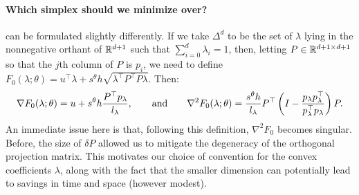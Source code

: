 \documentclass[eikonal.tex]{subfiles}
\begin{document}
\paragraph{Which simplex should we minimize over?}
 can be formulated
slightly differently. If we take $\Delta^d$ to be the set of $\lambda$
lying in the nonnegative orthant of $\mathbb{R}^{d+1}$ such that
$\sum_{i=0}^d \lambda_i = 1$, then, letting
$P \in \mathbb{R}^{d + 1 \times d + 1}$ so that the $j$th column of $P$ is
$p_i$, we need to define
$F_0(\lambda; \theta) = u^\top \lambda + s^{\theta} h \sqrt{\lambda^\top
  P^\top P \lambda}$. Then:
\begin{equation*}
  \nabla F_0(\lambda; \theta) = u + s^{\theta} h \frac{P^\top p_\lambda}{l_\lambda}, \qquad \text{and} \qquad \nabla^2 F_0(\lambda; \theta) = \frac{s^{\theta} h}{l_\lambda} P^\top \left(I - \frac{p_\lambda p_\lambda^\top}{p_\lambda^\top p_\lambda}\right) P.
\end{equation*}
An immediate issue here is that, following this definition,
$\nabla^2 F_0$ becomes singular. Before, the size of $\delta P$
allowed us to mitigate the degeneracy of the orthogonal projection
matrix. This motivates our choice of convention for the convex
coefficients $\lambda$, along with the fact that the smaller dimension
can potentially lead to savings in time and space (however modest).
\end{document}

